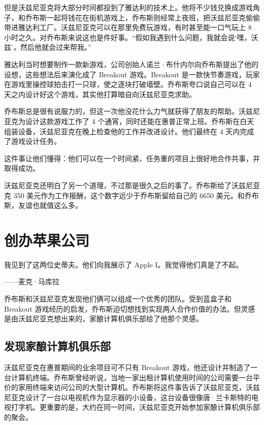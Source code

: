 \documentclass[12pt,UTF8]{ctexbook}
\begin{document}
但是沃兹尼亚克将大部分时间都投到了雅达利的技术上。他将不少钱兑换成游戏角子，和乔布斯一起将钱花在街机游戏上，乔布斯则经常上夜班，把沃兹尼亚克偷偷带进雅达利工厂。沃兹尼亚克可以在那里免费玩游戏，有时甚至能一口气玩上 8 小时之久。对乔布斯来说这也是件好事。“假如我遇到什么问题，我就会说‘嘿，沃兹’，然后他就会过来帮我。”

雅达利当时想要制作一款新游戏，公司创始人诺兰·布什内尔向乔布斯提出了他的设想，这些想法后来演化成了 Breakout 游戏。Breakout 是一款快节奏游戏，玩家在游戏里操控球拍击打一只球，使之逐块打破墙壁。乔布斯夸口说自己可以在 4 天之内设计好这个游戏，其实他打算暗自向沃兹尼亚克求助。

乔布斯总是很有说服力的，但这一次他没花什么力气就获得了朋友的帮助。沃兹尼亚克为设计这款游戏工作了 4 个通宵，同时还能在惠普正常上班。乔布斯在白天组装设备，沃兹尼亚克在晚上检查他的工作并改进设计。他们最终在 4 天内完成了游戏设计任务。

这件事让他们懂得：他们可以在一个时间紧、任务重的项目上很好地合作共事，并取得成功。

沃兹尼亚克还明白了另一个道理，不过那是很久之后的事了。乔布斯给了沃兹尼亚克 350 美元作为工作报酬，这个数字远少于乔布斯留给自己的 6650 美元。和乔布斯，友谊也就值这么多。





\section{创办苹果公司}


我见到了这两位史蒂夫。他们向我展示了 Apple I。我觉得他们真是了不起。

——麦克·马库拉



乔布斯和沃兹尼亚克发现他们俩可以组成一个优秀的团队。受到蓝盒子和 Breakout 游戏经历的启发，乔布斯迫切想找到实现两人合作价值的办法。但灵感是由沃兹尼亚克想出来的，家酿计算机俱乐部给了他那个灵感。





\subsection{发现家酿计算机俱乐部}


沃兹尼亚克在惠普期间的业余项目可不只有 Breakout 游戏，他还设计并制造了一台计算机终端。乔布斯曾经听说，当地一家出租计算机使用时间的公司需要一台平价的家用终端来访问公司的大型计算机。乔布斯将这件事告诉了沃兹尼亚克，沃兹尼亚克设计了一台以电视机作为显示器的小设备，这台设备很像唐·兰卡斯特的电视打字机。更重要的是，大约在同一时间，沃兹尼亚克开始参加家酿计算机俱乐部的聚会。
\end{document}
